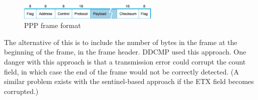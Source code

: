 \begin{figure}[H]
  \centering
  \includegraphics[width=0.6\textwidth]{img/PPP.png}
  \caption{PPP frame format}
  \label{fig:PPP}
\end{figure}

The alternative of this is to include the number of bytes in the frame at the beginning of the frame, in the frame header. DDCMP used this approach. One danger with this approach is that a transmission error could corrupt the count field, in which case the end of the frame would not be correctly detected. (A similar problem exists with the sentinel-based approach if the ETX field becomes corrupted.)
